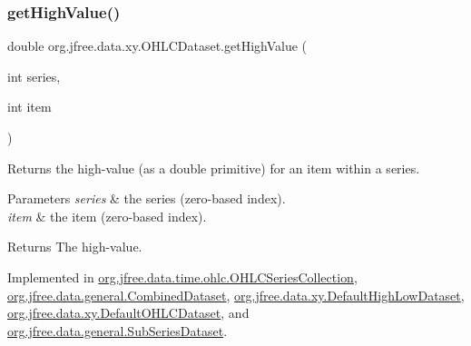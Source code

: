 \mbox{\label{interfaceorg_1_1jfree_1_1data_1_1xy_1_1_o_h_l_c_dataset_acd02ab8db72bebf0234954bd962365cb}} 
\subsubsection{\texorpdfstring{get\+High\+Value()}{getHighValue()}}
{\footnotesize\ttfamily double org.\+jfree.\+data.\+xy.\+O\+H\+L\+C\+Dataset.\+get\+High\+Value (\begin{DoxyParamCaption}\item[{int}]{series,  }\item[{int}]{item }\end{DoxyParamCaption})}

Returns the high-\/value (as a double primitive) for an item within a series.


\begin{DoxyParams}{Parameters}
{\em series} & the series (zero-\/based index). \\
\hline
{\em item} & the item (zero-\/based index).\\
\hline
\end{DoxyParams}
\begin{DoxyReturn}{Returns}
The high-\/value. 
\end{DoxyReturn}


Implemented in \mbox{\hyperlink{classorg_1_1jfree_1_1data_1_1time_1_1ohlc_1_1_o_h_l_c_series_collection_ae49cdfb833330fec9bb8a8e21683945c}{org.\+jfree.\+data.\+time.\+ohlc.\+O\+H\+L\+C\+Series\+Collection}}, \mbox{\hyperlink{classorg_1_1jfree_1_1data_1_1general_1_1_combined_dataset_a17e07dbe03ac67b77b4aa57e17f7b61a}{org.\+jfree.\+data.\+general.\+Combined\+Dataset}}, \mbox{\hyperlink{classorg_1_1jfree_1_1data_1_1xy_1_1_default_high_low_dataset_a00f2b176d8247829325f711fca2af339}{org.\+jfree.\+data.\+xy.\+Default\+High\+Low\+Dataset}}, \mbox{\hyperlink{classorg_1_1jfree_1_1data_1_1xy_1_1_default_o_h_l_c_dataset_a7c992f9b0fac581e574332c70329fae7}{org.\+jfree.\+data.\+xy.\+Default\+O\+H\+L\+C\+Dataset}}, and \mbox{\hyperlink{classorg_1_1jfree_1_1data_1_1general_1_1_sub_series_dataset_a63283b86bacb75de07fd3e4e8b5eae5b}{org.\+jfree.\+data.\+general.\+Sub\+Series\+Dataset}}.

